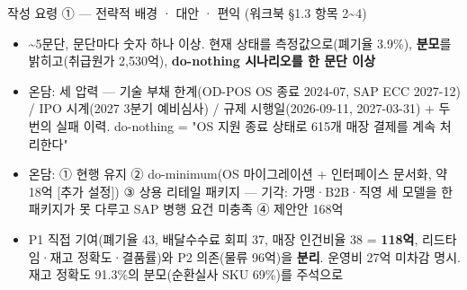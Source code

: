 \begin{frame}[allowframebreaks=1.0]{작성 요령 ① — 전략적 배경 · 대안 · 편익 (워크북 §1.3 항목 2\textasciitilde{}4)}
\small
\par\smallskip{}\nobreak
\begin{itemize}
\item{}\textasciitilde{}5문단, 문단마다 숫자 하나 이상. 현재 상태를 측정값으로(폐기율 3.9\%), \textbf{분모}를 밝히고(취급원가 2,530억), \textbf{do-nothing 시나리오를 한 문단 이상}
\item\relax 온담: 세 압력 — 기술 부채 한계(OD-POS OS 종료 2024-07, SAP ECC 2027-12) / IPO 시계(2027 3분기 예비심사) / 규제 시행일(2026-09-11, 2027-03-31) + 두 번의 실패 이력. do-nothing = "OS 지원 종료 상태로 615개 매장 결제를 계속 처리한다"
\end{itemize}
\par\smallskip{}\nobreak
\begin{itemize}
\item\relax 온담: ① 현행 유지 ② do-minimum(OS 마이그레이션 + 인터페이스 문서화, 약 18억 [추가 설정]) ③ 상용 리테일 패키지 — 기각: 가맹·B2B·직영 세 모델을 한 패키지가 못 다루고 SAP 병행 요건 미충족 ④ 제안안 168억
\end{itemize}
\par\smallskip{}\nobreak
\begin{itemize}
\item\relax P1 직접 기여(폐기율 43, 배달수수료 회피 37, 매장 인건비율 38 = \textbf{118억}, 리드타임·재고 정확도·결품률)와 P2 의존(물류 96억)을 \textbf{분리}. 운영비 27억 미차감 명시. 재고 정확도 91.3\%의 분모(순환실사 SKU 69\%)를 주석으로
\end{itemize}
\end{frame}

